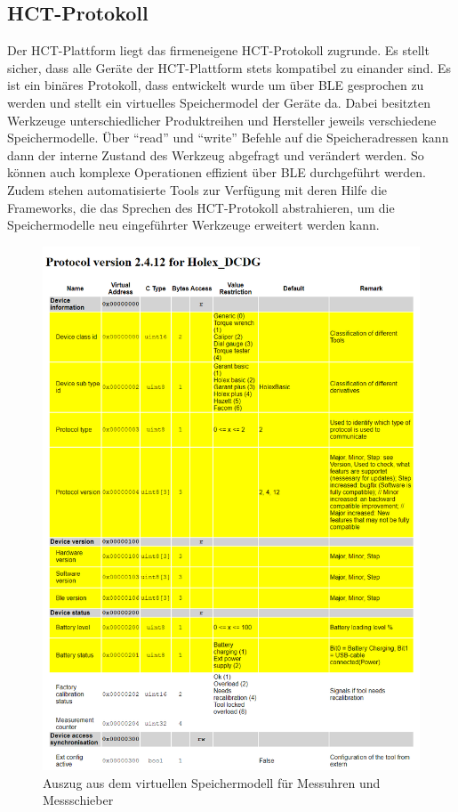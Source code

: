 \subsection{HCT-Protokoll}
Der \ac{HCT}-Plattform liegt das firmeneigene \ac{HCT}-Protokoll zugrunde. Es stellt sicher, dass alle Geräte der \ac{HCT}-Plattform stets kompatibel zu einander sind. Es ist ein binäres Protokoll, dass entwickelt wurde um über \ac{BLE} gesprochen zu werden und stellt ein virtuelles Speichermodel der Geräte da. Dabei besitzten Werkzeuge unterschiedlicher Produktreihen und Hersteller jeweils verschiedene Speichermodelle. Über ``read'' und ``write'' Befehle auf die Speicheradressen kann dann der interne Zustand des Werkzeug abgefragt und verändert werden. So können auch komplexe Operationen effizient über \ac{BLE} durchgeführt werden. Zudem stehen automatisierte Tools zur Verfügung mit deren Hilfe die Frameworks, die das Sprechen des HCT-Protokoll abstrahieren, um die Speichermodelle neu eingeführter Werkzeuge erweitert werden kann.
\begin{figure}[H] 
	\centering
	\includegraphics[width=\textwidth]{figures/HCT_Protocol_DCDG.png}
	\caption{Auszug aus dem virtuellen Speichermodell für Messuhren und Messschieber}
\end{figure}